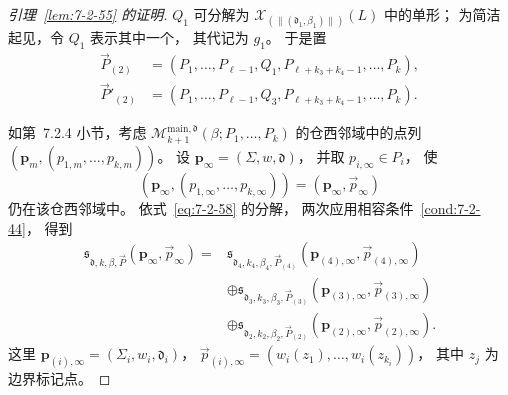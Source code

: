 \begin{proof}[引理~\ref{lem:7-2-55} 的证明]
$Q_1$ 可分解为
$\mathcal X_{(\|(\mathfrak d_1,\beta_1)\|)}(L)$
中的单形；
为简洁起见，令 $Q_1$ 表示其中一个，
其代记为 $g_1$。
于是置
\[
\begin{aligned}
\vec P_{(2)}
&=(P_1,\ldots,P_{\ell-1},Q_1,
P_{\ell+k_3+k_4-1},\ldots,P_k),\\
\vec P'_{(2)}
&=(P_1,\ldots,P_{\ell-1},Q_3,
P_{\ell+k_3+k_4-1},\ldots,P_k).
\end{aligned}
\]

如第~7.2.4 小节，考虑
$\mathcal M^{\mathrm{main},\mathfrak d}_{k+1}
(\beta;P_1,\ldots,P_k)$
的仓西邻域中的点列
$(\mathbf p_m,(p_{1,m},\ldots,p_{k,m}))$。
设 $\mathbf p_\infty=(\Sigma,w,\mathfrak d)$，
并取 $p_{i,\infty}\in P_i$，
使
\[
(\mathbf p_\infty,(p_{1,\infty},\ldots,p_{k,\infty}))
=(\mathbf p_\infty,\vec p_\infty)
\]
仍在该仓西邻域中。
依式~\eqref{eq:7-2-58} 的分解，
两次应用相容条件~\ref{cond:7-2-44}，
得到
\begin{equation}
\begin{aligned}
\mathfrak s_{\mathfrak d,k,\beta,\vec P}
(\mathbf p_\infty,\vec p_\infty)
={}&\mathfrak s_{\mathfrak d_4,k_4,\beta_4,\vec P_{(4)}}
(\mathbf p_{(4),\infty},\vec p_{(4),\infty})\\
&\oplus
\mathfrak s_{\mathfrak d_3,k_3,\beta_3,\vec P_{(3)}}
(\mathbf p_{(3),\infty},\vec p_{(3),\infty})\\
&\oplus
\mathfrak s_{\mathfrak d_2,k_2,\beta_2,\vec P_{(2)}}
(\mathbf p_{(2),\infty},\vec p_{(2),\infty}).
\end{aligned}
\tag{7.2.59}\label{eq:7-2-59}
\end{equation}
这里
$\mathbf p_{(i),\infty}=(\Sigma_i,w_i,\mathfrak d_i)$，
$\vec p_{(i),\infty}
=(w_i(z_1),\ldots,w_i(z_{k_i}))$，
其中 $z_j$ 为边界标记点。


\end{proof}
